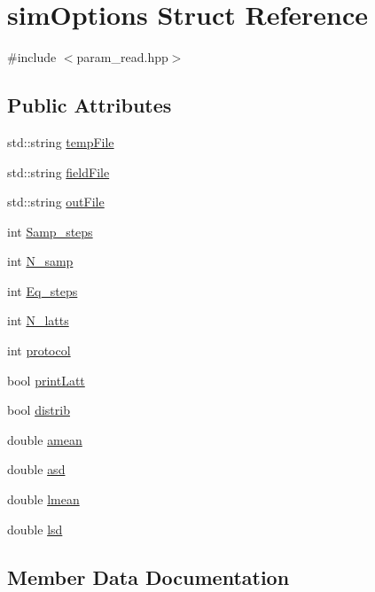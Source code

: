 \hypertarget{structsimOptions}{}\section{sim\+Options Struct Reference}
\label{structsimOptions}


{\ttfamily \#include $<$param\+\_\+read.\+hpp$>$}

\subsection*{Public Attributes}
\begin{DoxyCompactItemize}
\item 
std\+::string \hyperlink{structsimOptions_a42a20f246c7029967d29a15e4d5aac16}{temp\+File}
\item 
std\+::string \hyperlink{structsimOptions_afb799330b8e40d76661b590ce0e792e6}{field\+File}
\item 
std\+::string \hyperlink{structsimOptions_ad95991f4f13947624c4e44ea12845c18}{out\+File}
\item 
int \hyperlink{structsimOptions_a5890487eea2252d4d84f67615269128f}{Samp\+\_\+steps}
\item 
int \hyperlink{structsimOptions_a94b0e70bb9de2b53a815b67879929b65}{N\+\_\+samp}
\item 
int \hyperlink{structsimOptions_a68e2dc1a21bc70873cdd518cf90b01f0}{Eq\+\_\+steps}
\item 
int \hyperlink{structsimOptions_a22e632d6787e16c4a95781ea672184ba}{N\+\_\+latts}
\item 
int \hyperlink{structsimOptions_a0b1b41d907adf31c75d5b9e9a413931d}{protocol}
\item 
bool \hyperlink{structsimOptions_adfcfbb12e77d12d285cefc5045a07255}{print\+Latt}
\item 
bool \hyperlink{structsimOptions_ac515e118d7c1c579e0cf9e789c1c6926}{distrib}
\item 
double \hyperlink{structsimOptions_a8af2a6dac9cbe680605b83147dca9b96}{amean}
\item 
double \hyperlink{structsimOptions_a97b27544bdce1f29971f1501a15a3fe5}{asd}
\item 
double \hyperlink{structsimOptions_a4f77eb0b474df8666c76e29c322d4276}{lmean}
\item 
double \hyperlink{structsimOptions_aa167da0ff74e6ba414e67213f67abd2f}{lsd}
\end{DoxyCompactItemize}


\subsection{Member Data Documentation}

